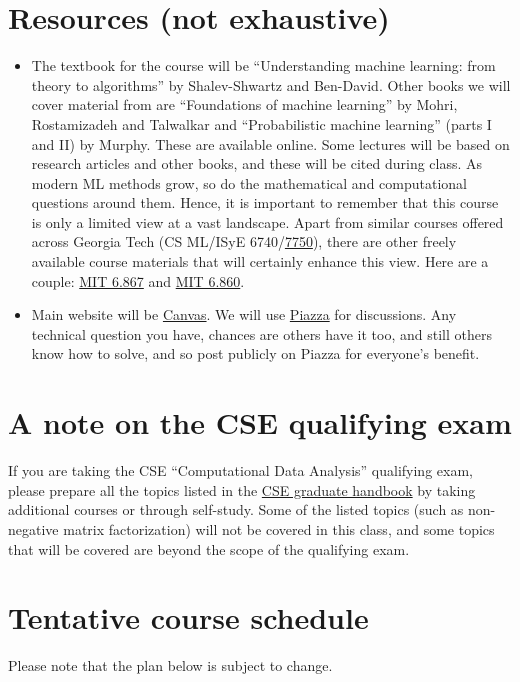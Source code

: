 \documentclass[12pt]{article}
\begin{document}
\section{Resources (not exhaustive)}
\label{sec:resources}
\begin{itemize}
	\item The textbook for the course will be ``Understanding machine learning: from theory to algorithms'' by Shalev-Shwartz and Ben-David. Other books we will cover material from are ``Foundations of machine learning'' by Mohri, Rostamizadeh and Talwalkar and ``Probabilistic machine learning'' (parts I and II) by Murphy. These are available online. Some lectures will be based on research articles and other books, and these will be cited during class. 
As modern ML methods grow, so do the mathematical and computational questions around them. Hence, it is important to remember that this course is only a limited view at a vast landscape. Apart from similar courses offered across Georgia Tech (CS ML/ISyE 6740/\href{https://sites.gatech.edu/ashwin-pananjady/7750-mathematical-foundations-of-machine-learning-fall-22/}{7750}), there are other freely available course materials that will certainly enhance this view. Here are a couple: \href{https://ocw.mit.edu/courses/6-867-machine-learning-fall-2006/}{MIT 6.867} and \href{http://www.mit.edu/~9.520/fall19/}{MIT 6.860}.

	\item Main website will be \href{https://canvas.gatech.edu}{Canvas}. We will use \href{https://piazza.com/gatech/fall2023/cse6740a/info}{Piazza} for discussions. Any technical question you have, chances are others have it too, and still others know how to solve, and so post publicly on Piazza for everyone's benefit. 
\end{itemize}
\section{A note on the CSE qualifying exam}
If you are taking the CSE ``Computational Data Analysis'' qualifying exam, please prepare all the topics listed in the \href{https://cse.gatech.edu/sites/default/files/documents/2023/Handbook-2023-06-07.pdf}{CSE graduate handbook} by taking additional courses or through self-study. Some of the listed topics (such as non-negative matrix factorization) will not be covered in this class, and some topics that will be covered are beyond the scope of the qualifying exam.
\
\section{Tentative course schedule}
Please note that the plan below is subject to change.
\end{document}

